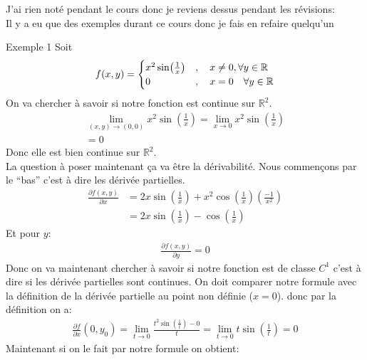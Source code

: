 J'ai rien noté pendant le cours donc je reviens dessus pendant les révisions:\\
Il y a eu que des exemples durant ce cours donc je fais en refaire quelqu'un
\begin{parag}{Exemple 1}
    Soit
    \begin{align*} f\left(x, y\right) =  
    \begin{cases}
        x^2 \sin\left(\frac{1}{x}\right) &, \mathspace x \neq 0, \forall y \in \mathbb{R}\\
        0 &, \mathspace x = 0 \mathspace \forall y \in \mathbb{R}
    \end{cases}
    \end{align*}
    On va chercher à savoir si notre fonction est continue sur $\mathbb{R}^2$.
    \begin{align*} 
        \lim_{\left(x, y\right) \to \left(0,0\right)} x^2 \sin\left(\frac{1}{x}\right) = \lim_{x \to 0} x^2 \sin\left(\frac{1}{x}\right)\\
        = 0
    \end{align*}
    Donc elle est bien continue sur $\mathbb{R}^{2}$.\\
    La question à poser maintenant ça va être la dérivabilité. Nous commençons par le ``bas'' c'est à dire les dérivée partielles.\\
    \begin{align*} \frac{\partial f\left(x, y\right)}{\partial x} &= 2x \sin\left(\frac{1}{x}\right) + x^2 \cos\left(\frac{1}{x}\right)\left(\frac{-1}{x^2}\right)\\
    &= 2x \sin\left(\frac{1}{x}\right) - \cos\left(\frac{1}{x}\right)   \end{align*}
     Et pour $y$:
     \begin{align*} \frac{\partial f\left(x, y\right)}{\partial y} = 0  \end{align*}
     Donc on va maintenant chercher à savoir si notre fonction est de classe $C^1$ c'est à dire si les dérivée partielles sont continues. On doit comparer notre formule avec la définition de la dérivée partielle au point non définie ($x = 0$). donc par la définition  on a:
     \begin{align*} 
         \frac{\partial f}{\partial x} \left(0, y_0\right) =  \lim_{t   \to 0} \frac{t^2\sin\left(\frac{1}{t}\right) - 0}{t} =  \lim_{t \to 0} t \sin\left(\frac{1}{t}\right) = 0
     \end{align*}
     Maintenant si on le fait par notre formule on obtient:
     \begin{align*} 

\end{align*}
\end{parag}
